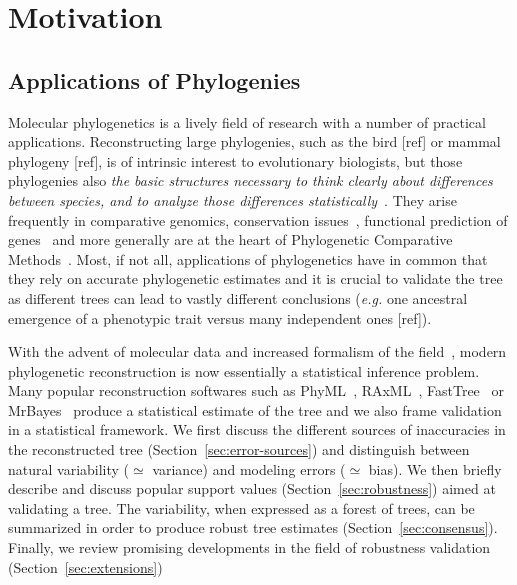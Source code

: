 \section{Motivation} \label{sec:Motivation}

\subsection{Applications of Phylogenies} \label{sec:applications}

Molecular phylogenetics is a lively field of research with a number of practical applications. 
Reconstructing large phylogenies, such as the bird [ref] or mammal phylogeny [ref], is of intrinsic interest 
to evolutionary biologists, but those phylogenies also \emph{the basic structures necessary to think clearly about differences between species, and to analyze those differences statistically}~\citep{Felsenstein2004}. They arise frequently in comparative genomics, conservation issues~\citep{Bordewich2008}, functional prediction of genes~\citep{Eisen1998} and more generally are at the heart of Phylogenetic Comparative Methods~\citep{Revell2008, Pennell2013}. Most, if not all, applications of phylogenetics have in common that they rely on accurate phylogenetic estimates and it is crucial to validate the tree as different trees can lead to vastly different conclusions (\emph{e.g.} one ancestral emergence of a phenotypic trait versus many independent ones [ref]).  

With the advent of molecular data and increased formalism of the field~\citep{Gascuel2005a}, modern phylogenetic reconstruction is now essentially a statistical inference problem. Many popular reconstruction softwares such as PhyML~\citep{Guindon2003}, RAxML~\citep{Stamatakis2006}, FastTree~\citep{Price2010} or MrBayes~\citep{Ronquist2003} produce a statistical estimate of the tree and we also frame validation in a statistical framework. We first discuss the different sources of inaccuracies in the reconstructed tree (Section~\ref{sec:error-sources}) and distinguish between natural variability ($\simeq$ variance) and modeling errors ($\simeq$ bias). We then briefly describe and discuss popular support values (Section~\ref{sec:robustness}) aimed at validating a tree. The variability, when expressed as a forest of trees, can be summarized in order to produce robust tree estimates (Section~\ref{sec:consensus}). Finally, we review promising developments in the field of robustness validation (Section~\ref{sec:extensions})

